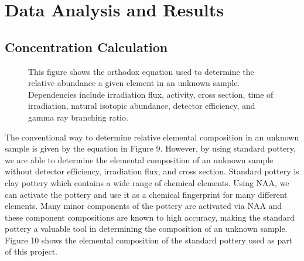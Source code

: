 \documentclass[]{article}
\begin{document}
\pagebreak
\section{Data Analysis and Results}
\subsection{Concentration Calculation}

\begin{figure}[h]
\centering
{}
\caption{This figure shows the orthodox equation used to determine the relative abundance a given element in an unknown sample. Dependencies include irradiation flux, activity, cross section, time of irradiation, natural isotopic abundance, detector efficiency, and gamma ray branching ratio.}
\end{figure}

The conventional way to determine relative elemental composition in an unknown sample is given by the equation in Figure 9. However, by using standard pottery, we are able to determine the elemental composition of an unknown sample without detector efficiency, irradiation flux, and cross section. Standard pottery is clay pottery which contains a wide range of chemical elements. Using NAA, we can activate the pottery and use it as a chemical fingerprint for many different elements. Many minor components of the pottery are activated via NAA and these component compositions are known to high accuracy, making the standard pottery a valuable tool in determining the composition of an unknown sample. Figure 10 shows the elemental composition of the standard pottery used as part of this project.
\end{document}
